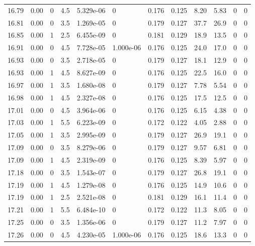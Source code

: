 \documentclass[preview]{standalone}
\begin{document}
{{{{{{{{{{{{{{{{\begin{tabular}{L{1.2cm}C{1.2cm} C{0.3cm}C{0.5cm} C{1.4cm}C{1.4cm} C{1.4cm}C{1.4cm} C{1.6cm}C{1.6cm} C{1.6cm}C{1.6cm}}
  16.79  &  0.00  & 0     & 4.5 &  5.329e-06  & 0  &  0.176&   0.125& 8.20 & 5.83   &  0 & 0  \\ 
  16.81  &  0.00  & 0     & 3.5 &  1.269e-05  & 0  &  0.179&   0.127& 37.7 & 26.9   &  0 & 0  \\ 
  16.85  &  0.00  & 1     & 2.5 &  6.455e-09  & 0  &  0.181&   0.129& 18.9 & 13.5   &  0 & 0  \\ 
  16.91  &  0.00  & 0     & 4.5 &  7.728e-05  & 1.000e-06  &  0.176&   0.125& 24.0 & 17.0   &  0 & 0  \\ 
  16.93  &  0.00  & 0     & 3.5 &  2.718e-05  & 0  &  0.179&   0.127& 18.1 & 12.9   &  0 & 0  \\ 
  16.93  &  0.00  & 1     & 4.5 &  8.627e-09  & 0  &  0.176&   0.125& 22.5 & 16.0   &  0 & 0  \\ 
  16.97  &  0.00  & 1     & 3.5 &  1.680e-08  & 0  &  0.179&   0.127& 7.78 & 5.54   &  0 & 0  \\ 
  16.98  &  0.00  & 1     & 4.5 &  2.327e-08  & 0  &  0.176&   0.125& 17.5 & 12.5   &  0 & 0  \\ 
  17.01  &  0.00  & 0     & 4.5 &  3.964e-06  & 0  &  0.176&   0.125& 6.15 & 4.38   &  0 & 0  \\ 
  17.03  &  0.00  & 1     & 5.5 &  6.223e-09  & 0  &  0.172&   0.122& 4.05 & 2.88   &  0 & 0  \\ 
  17.05  &  0.00  & 1     & 3.5 &  2.995e-09  & 0  &  0.179&   0.127& 26.9 & 19.1   &  0 & 0  \\ 
  17.09  &  0.00  & 0     & 3.5 &  8.279e-06  & 0  &  0.179&   0.127& 9.57 & 6.81   &  0 & 0  \\ 
  17.09  &  0.00  & 1     & 4.5 &  2.319e-09  & 0  &  0.176&   0.125& 8.39 & 5.97   &  0 & 0  \\ 
  17.18  &  0.00  & 0     & 3.5 &  1.543e-07  & 0  &  0.179&   0.127& 26.8 & 19.1   &  0 & 0  \\ 
  17.19  &  0.00  & 1     & 4.5 &  1.279e-08  & 0  &  0.176&   0.125& 14.9 & 10.6   &  0 & 0  \\ 
  17.19  &  0.00  & 1     & 2.5 &  2.521e-08  & 0  &  0.181&   0.129& 16.1 & 11.4   &  0 & 0  \\ 
  17.21  &  0.00  & 1     & 5.5 &  6.484e-10  & 0  &  0.172&   0.122& 11.3 & 8.05   &  0 & 0  \\ 
  17.25  &  0.00  & 0     & 3.5 &  1.356e-06  & 0  &  0.179&   0.127& 11.2 & 7.97   &  0 & 0  \\ 
  17.26  &  0.00  & 0     & 4.5 &  4.230e-05  & 1.000e-06  &  0.176&   0.125& 18.6 & 13.3   &  0 & 0  \\ 

\end{tabular}}}}}}}}}}}}}}}}}
\end{document}
